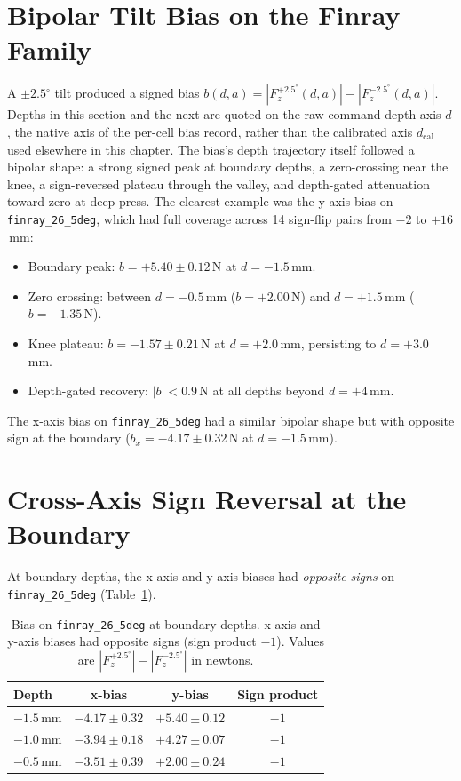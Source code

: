 \section{Bipolar Tilt Bias on the Finray Family}
\label{sec:bipolar-bias-results}

A $\pm 2.5^{\circ}$ tilt produced a signed bias
$b(d,a) = |F_z^{+2.5^{\circ}}(d,a)| - |F_z^{-2.5^{\circ}}(d,a)|$.
Depths in this section and the next are quoted on the raw command-depth
axis $d$, the native axis of the per-cell bias record, rather than the
calibrated axis $d_{\text{cal}}$ used elsewhere in this chapter. The
bias's depth trajectory itself followed a bipolar shape: a strong signed
peak at boundary depths, a zero-crossing near the knee, a sign-reversed
plateau through the valley, and depth-gated attenuation toward zero at
deep press. The clearest example was the y-axis bias on
\texttt{finray\_26\_5deg}, which had full coverage across 14 sign-flip
pairs from $-2$ to $+16$\,mm:

\begin{itemize}
  \item Boundary peak: $b = +5.40 \pm 0.12$\,N at $d = -1.5$\,mm.
  \item Zero crossing: between $d = -0.5$\,mm ($b = +2.00$\,N) and
        $d = +1.5$\,mm ($b = -1.35$\,N).
  \item Knee plateau: $b = -1.57 \pm 0.21$\,N at $d = +2.0$\,mm,
        persisting to $d = +3.0$\,mm.
  \item Depth-gated recovery: $|b| < 0.9$\,N at all depths beyond
        $d = +4$\,mm.
\end{itemize}

The x-axis bias on \texttt{finray\_26\_5deg} had a similar bipolar
shape but with opposite sign at the boundary
($b_x = -4.17 \pm 0.32$\,N at $d = -1.5$\,mm).

\section{Cross-Axis Sign Reversal at the Boundary}
\label{sec:cross-axis-results}

At boundary depths, the x-axis and y-axis biases had \emph{opposite
signs} on \texttt{finray\_26\_5deg} (Table~\ref{tab:cross-axis-sign}).

\begin{table}[ht]
\centering
\caption[Cross-axis bias sign reversal at boundary]{Bias on
\texttt{finray\_26\_5deg} at boundary depths. x-axis and y-axis biases
had opposite signs (sign product $-1$). Values are
$|F_z^{+2.5^{\circ}}|-|F_z^{-2.5^{\circ}}|$ in newtons.}
\label{tab:cross-axis-sign}
\begin{tabular}{lccc}
\toprule
Depth & x-bias & y-bias & Sign product \\
\midrule
$-1.5$\,mm & $-4.17 \pm 0.32$ & $+5.40 \pm 0.12$ & $-1$ \\
$-1.0$\,mm & $-3.94 \pm 0.18$ & $+4.27 \pm 0.07$ & $-1$ \\
$-0.5$\,mm & $-3.51 \pm 0.39$ & $+2.00 \pm 0.24$ & $-1$ \\
\bottomrule
\end{tabular}
\end{table}

